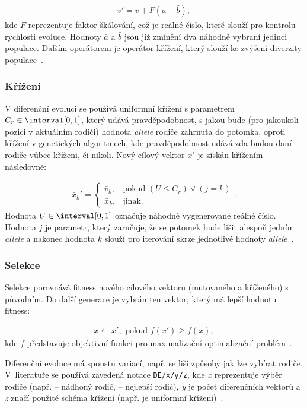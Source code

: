 \begin{align}
    \label{eq:DE1}
    \bar{v}' = \bar{v} + F (\bar{a} - \bar{b}),
\end{align}
kde $F$ reprezentuje faktor škálování, což je reálné číslo, které slouží pro kontrolu rychlosti evoluce. Hodnoty $\bar{a}$ a $\bar{b}$ jsou již zmínění dva náhodně vybraní jedinci populace. Dalším operátorem je operátor křížení, který slouží ke zvýšení diverzity populace~\cite{introductionEvo}.

\subsubsection{Křížení}
V diferenční evoluci se používá uniformní křížení s parametrem $C_r \in \interval[{0,1}]$, který udává pravděpodobnost, s jakou bude (pro jakoukoli pozici v aktuálním rodiči) hodnota \emph{allele} rodiče zahrnuta do potomka, oproti křížení v genetických algoritmech, kde pravděpodobnost udává zda budou daní rodiče vůbec kříženi, či nikoli. Nový cílový vektor $\bar{x}'$ je získán křížením následovně:

\begin{align}
    \label{eq:DE2}
    \bar{x}_k' = \begin{cases}
               \bar{v}_k, & \text{pokud } (U \leq C_r) \lor (j = k) \\
               \bar{x}_k, & \text{jinak}.
               \end{cases}.
\end{align}
Hodnota $U \in \interval[{0,1}]$ označuje náhodně vygenerované reálné číslo. Hodnota $j$ je parametr, který zaručuje, že se potomek bude lišit alespoň jedním \emph{allele} a nakonec hodnota $k$ slouží pro iterování skrze jednotlivé hodnoty \emph{allele}~\cite{DE_GA_TSP}.

\subsubsection{Selekce}
Selekce porovnává fitness nového cílového vektoru (mutovaného a kříženého) s původním. Do další generace je vybrán ten vektor, který má lepší hodnotu fitness:

\begin{align}
    \label{eq:DE3}
    \bar{x} \leftarrow \bar{x}', \text{ pokud } f(\bar{x}') \geq f(\bar{x}),
\end{align}
kde $f$ představuje objektivní funkci pro maximalizační optimalizační problém~\cite{DE_GA_TSP}.

Diferenční evoluce má spoustu variací, např. se liší způsoby jak lze vybírat rodiče. V~literatuře se používá zavedená notace \texttt{DE/x/y/z}, kde \emph{x} reprezentuje výběr rodiče (např.  -- nádhoný rodič,  -- nejlepší rodič), \emph{y} je počet diferenčních vektorů a \emph{z} značí použité schéma křížení (např.  je uniformní křížení)~\cite{introductionEvo}.



